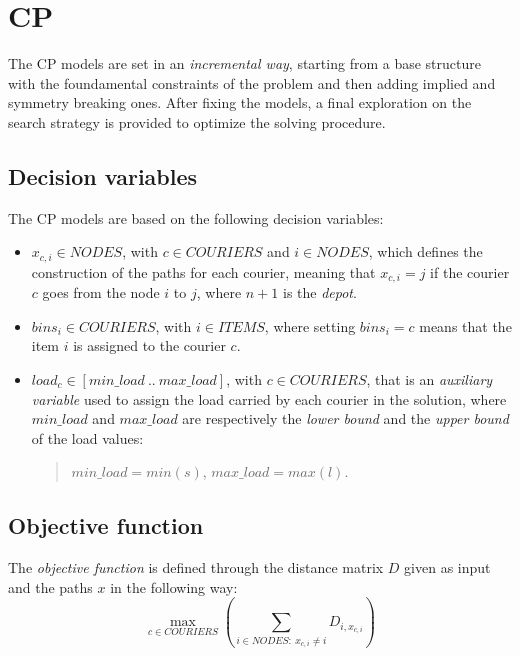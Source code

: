 \section{CP}
The CP models are set in an \textit{incremental way}, starting from a base structure with the foundamental constraints of the problem and then adding implied and symmetry breaking ones. After fixing the models, a final exploration on the search strategy is provided to optimize the solving procedure.



\subsection{Decision variables}
The CP models are based on the following decision variables:
\begin{itemize}
    \item $x_{c, i} \in NODES$, with $c \in COURIERS$ and $i \in NODES$, which defines the construction of the paths for each courier, meaning that $x_{c, i} = j$ if the courier $c$ goes from the node $i$ to $j$, where $n+1$ is the \textit{depot}.
    
    \item $bins_i \in COURIERS$, with $i \in ITEMS$, where setting $bins_i = c$ means that the item $i$ is assigned to the courier $c$.
    
    \item $load_c \in [min\_load\ ..\ max\_load]$, with $c \in COURIERS$, that is an \textit{auxiliary variable} used to assign the load carried by each courier in the solution, where $min\_load$ and $max\_load$ are respectively the \textit{lower bound} and the \textit{upper bound} of the load values:
    \begin{quote}
        \centering
        $min\_load = min(s)$, $max\_load = max(l)$.
    \end{quote}
\end{itemize}



\subsection{Objective function}
The \textit{objective function} is defined through the distance matrix $D$ given as input and the paths $x$ in the following way:
\begin{equation}
    \max_{c \in COURIERS} \left( \sum_{i \in NODES:\ x_{c, i} \neq i} D_{i, x_{c, i}} \right)
\end{equation}



